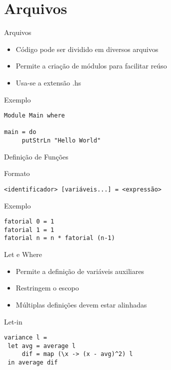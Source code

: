 \documentclass{beamer}
\begin{document}
	\section{Arquivos}
	
	\begin{frame}{}
	\end{frame}
	
		\begin{frame}[fragile]{Arquivos}
		 \begin{itemize}
		  \item Código pode ser dividido em diversos arquivos
		  \item Permite a criação de módulos para facilitar reúso
		  \item Usa-se a extensão .hs
		 \end{itemize}
		 
		 \begin{block}{Exemplo}
		  \begin{lstlisting}
Module Main where

main = do
     putStrLn "Hello World"
		  \end{lstlisting}
		 \end{block}
		\end{frame}
		
		\begin{frame}[fragile]{Definição de Funções}
		 \begin{block}{Formato}
		  \begin{lstlisting}
<identificador> [variáveis...] = <expressão>
		  \end{lstlisting}
		 \end{block}
		 
		 \begin{block}{Exemplo}
		  \begin{lstlisting}
fatorial 0 = 1
fatorial 1 = 1
fatorial n = n * fatorial (n-1)
		  \end{lstlisting}
		 \end{block}
		\end{frame}
		
		\begin{frame}[fragile]{Let e Where}
		 \begin{itemize}
		  \item Permite a definição de variáveis auxiliares
		  \item Restringem o escopo
		  \item Múltiplas definições devem estar alinhadas
		 \end{itemize}
		 \begin{block}{Let-in}
		  \begin{lstlisting}
variance l =
 let avg = average l
     dif = map (\x -> (x - avg)^2) l
 in average dif
		  \end{lstlisting}	  
		 \end{block}
		\end{frame}
		
\end{document}
